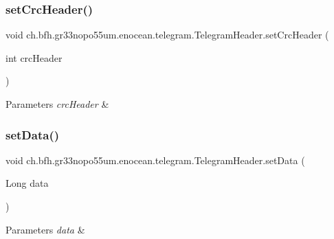 \subsubsection{\texorpdfstring{set\+Crc\+Header()}{setCrcHeader()}}
{\footnotesize\ttfamily void ch.\+bfh.\+gr33nopo55um.\+enocean.\+telegram.\+Telegram\+Header.\+set\+Crc\+Header (\begin{DoxyParamCaption}\item[{int}]{crc\+Header }\end{DoxyParamCaption})}


\begin{DoxyParams}{Parameters}
{\em crc\+Header} & \\
\hline
\end{DoxyParams}
\hypertarget{classch_1_1bfh_1_1gr33nopo55um_1_1enocean_1_1telegram_1_1_telegram_header_afdafff6ff39ba1b252d0ef9634355d6c}{}\label{classch_1_1bfh_1_1gr33nopo55um_1_1enocean_1_1telegram_1_1_telegram_header_afdafff6ff39ba1b252d0ef9634355d6c} 
\subsubsection{\texorpdfstring{set\+Data()}{setData()}}
{\footnotesize\ttfamily void ch.\+bfh.\+gr33nopo55um.\+enocean.\+telegram.\+Telegram\+Header.\+set\+Data (\begin{DoxyParamCaption}\item[{Long}]{data }\end{DoxyParamCaption})}


\begin{DoxyParams}{Parameters}
{\em data} & \\
\hline
\end{DoxyParams}
\hypertarget{classch_1_1bfh_1_1gr33nopo55um_1_1enocean_1_1telegram_1_1_telegram_header_a84897f02d09c4e945d65ac4e1ceb89b9}{}\label{classch_1_1bfh_1_1gr33nopo55um_1_1enocean_1_1telegram_1_1_telegram_header_a84897f02d09c4e945d65ac4e1ceb89b9} 
